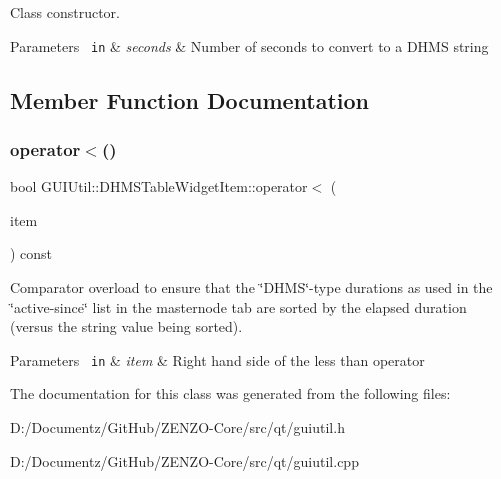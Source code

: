 Class constructor. 
\begin{DoxyParams}[1]{Parameters}
\mbox{\texttt{ in}}  & {\em seconds} & Number of seconds to convert to a D\+H\+MS string \\
\hline
\end{DoxyParams}


\subsection{Member Function Documentation}
\mbox{\label{class_g_u_i_util_1_1_d_h_m_s_table_widget_item_ab386d4d66b8eb16a216ddaf73d1799fa}} 
\subsubsection{\texorpdfstring{operator$<$()}{operator<()}}
{\footnotesize\ttfamily bool G\+U\+I\+Util\+::\+D\+H\+M\+S\+Table\+Widget\+Item\+::operator$<$ (\begin{DoxyParamCaption}\item[{Q\+Table\+Widget\+Item const \&}]{item }\end{DoxyParamCaption}) const\hspace{0.3cm}{\ttfamily [virtual]}}

Comparator overload to ensure that the \char`\"{}\+D\+H\+M\+S\char`\"{}-\/type durations as used in the \char`\"{}active-\/since\char`\"{} list in the masternode tab are sorted by the elapsed duration (versus the string value being sorted). 
\begin{DoxyParams}[1]{Parameters}
\mbox{\texttt{ in}}  & {\em item} & Right hand side of the less than operator \\
\hline
\end{DoxyParams}


The documentation for this class was generated from the following files\+:\begin{DoxyCompactItemize}
\item 
D\+:/\+Documentz/\+Git\+Hub/\+Z\+E\+N\+Z\+O-\/\+Core/src/qt/guiutil.\+h\item 
D\+:/\+Documentz/\+Git\+Hub/\+Z\+E\+N\+Z\+O-\/\+Core/src/qt/guiutil.\+cpp\end{DoxyCompactItemize}
